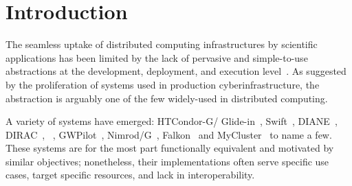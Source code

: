 \documentclass{sig-alternate}
\begin{document}
\begin{abstract}
\end{abstract}

\section{Introduction}
\label{sec:intro}


The seamless uptake of distributed computing infrastructures by scientific
applications has been limited by the lack of pervasive and simple-to-use
abstractions at the development, deployment, and execution
level~\cite{dpa_surveypaper,dpagrid2009}.  As suggested by the proliferation of
\pilotjob systems used in production cyberinfrastructure, the \pilotjob
abstraction is arguably one of the few widely-used in distributed computing.

A variety of \pilotjob systems have emerged: HTCondor-G/
Glide-in~\cite{frey2002condorG}, Swift~\cite{wilde2011swift},
DIANE~\cite{moscicki2003diane}, DIRAC~\cite{casajus2010dirac},
\panda~\cite{chiu2010pilot}, GWPilot~\cite{rubio2015gwpilot},
Nimrod/G~\cite{buyya2000nimrod}, Falkon~\cite{raicu2007} and
MyCluster~\cite{walker2006creating} to name a few. These
systems are for the most part functionally equivalent and motivated by similar
objectives; nonetheless, their implementations often serve specific use cases,
target specific resources, and lack in interoperability.
\end{document}

